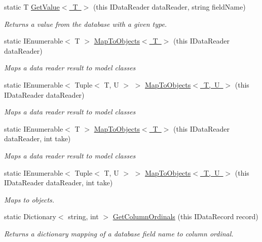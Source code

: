 \begin{DoxyCompactItemize}
\item 
static T \mbox{\hyperlink{class_blue_cloud_1_1_extensions_1_1_data_1_1_i_data_reader_extensions_a9f0ec28408443dd8a53d3eebb81e4dda}{Get\+Value$<$ T $>$}} (this I\+Data\+Reader data\+Reader, string field\+Name)
\begin{DoxyCompactList}\small\item\em Returns a value from the database with a given type. \end{DoxyCompactList}\item 
static I\+Enumerable$<$ T $>$ \mbox{\hyperlink{class_blue_cloud_1_1_extensions_1_1_data_1_1_i_data_reader_extensions_a96d6babf950003a62ab3dab97d868c53}{Map\+To\+Objects$<$ T $>$}} (this I\+Data\+Reader data\+Reader)
\begin{DoxyCompactList}\small\item\em Maps a data reader result to model classes \end{DoxyCompactList}\item 
static I\+Enumerable$<$ Tuple$<$ T, U $>$ $>$ \mbox{\hyperlink{class_blue_cloud_1_1_extensions_1_1_data_1_1_i_data_reader_extensions_af125bc42a7dc02955ce4322f138c8648}{Map\+To\+Objects$<$ T, U $>$}} (this I\+Data\+Reader data\+Reader)
\begin{DoxyCompactList}\small\item\em Maps a data reader result to model classes \end{DoxyCompactList}\item 
static I\+Enumerable$<$ T $>$ \mbox{\hyperlink{class_blue_cloud_1_1_extensions_1_1_data_1_1_i_data_reader_extensions_a4cb93e1c624aa13c212084880c57c243}{Map\+To\+Objects$<$ T $>$}} (this I\+Data\+Reader data\+Reader, int take)
\begin{DoxyCompactList}\small\item\em Maps a data reader result to model classes \end{DoxyCompactList}\item 
static I\+Enumerable$<$ Tuple$<$ T, U $>$ $>$ \mbox{\hyperlink{class_blue_cloud_1_1_extensions_1_1_data_1_1_i_data_reader_extensions_ac1ab442430a138f00d6845d5d7b30241}{Map\+To\+Objects$<$ T, U $>$}} (this I\+Data\+Reader data\+Reader, int take)
\begin{DoxyCompactList}\small\item\em Maps to objects. \end{DoxyCompactList}\item 
static Dictionary$<$ string, int $>$ \mbox{\hyperlink{class_blue_cloud_1_1_extensions_1_1_data_1_1_i_data_reader_extensions_a6f7b4f6e3b78a8a6eea6bcd8927c5531}{Get\+Column\+Ordinals}} (this I\+Data\+Record record)
\begin{DoxyCompactList}\small\item\em Returns a dictionary mapping of a database field name to column ordinal. \end{DoxyCompactList}\end{DoxyCompactItemize}
